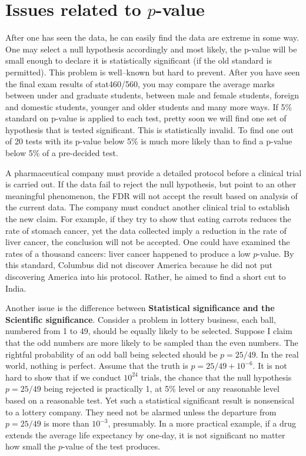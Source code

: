 \section{Issues related to $p$-value}
After one has seen the data, he can easily find the data are extreme
in some way. One may select a null hypothesis accordingly and most
likely, the p-value will be small enough to declare it is statistically
significant (if the old standard is permitted). This
problem is well--known but hard to prevent. 
After you have seen the final exam results of stat460/560, 
you may compare the average marks between under and graduate students, 
between male and female students, foreign and domestic students, 
younger and older students and many more ways. 
If 5\% standard on p-value is applied to each test, pretty soon
we will find one set of hypothesis that is tested significant. This is statistically invalid. To find
one out of 20 tests with its p-value below 5\% is much more likely than
to find a p-value below 5\% of a pre-decided test.

A pharmaceutical company must provide a detailed protocol
before a clinical trial is carried out. If the data fail to reject the null
hypothesis, but point to an other meaningful phenomenon, 
the FDR will not accept the result based on analysis of the current data.
The company must conduct another clinical trial to establish the new claim. 
For example, if they try to show that eating carrots reduces
the rate of stomach cancer, yet the data collected imply a reduction
in the rate of liver cancer, the conclusion will not be accepted. 
One could have examined the rates of a thousand cancers: liver
cancer happened to produce a low $p$-value.
By this standard, Columbus did not discover America because
he did not put discovering America into his protocol.
Rather, he aimed to find a short cut to India.

Another issue is the difference between 
{\bf Statistical significance and the Scientific significance}. 
Consider a problem in lottery business,
each ball, numbered from 1 to 49, should be equally likely to be
selected. Suppose I claim that the odd numbers are more likely to be
sampled than the even numbers. The rightful probability of
an odd ball being selected should be $p=25/49$.
In the real world, nothing is perfect. Assume that the truth
is $p = 25/49 + 10^{-6}$. It is not hard to show that if we 
conduct $10^{24}$ trials, the chance that the null hypothesis $p=25/49$
being rejected is practically 1, at 5\% level or any reasonable level
based on a reasonable test.
Yet such a statistical significant result is nonsensical to a lottery company.
They need not be alarmed unless the departure from $p = 25/49$ is
more than $10^{-3}$, presumably. In a more practical example, if a drug
extends the average life expectancy by one-day, it is not significant
no matter how small the $p$-value of the test produces.

